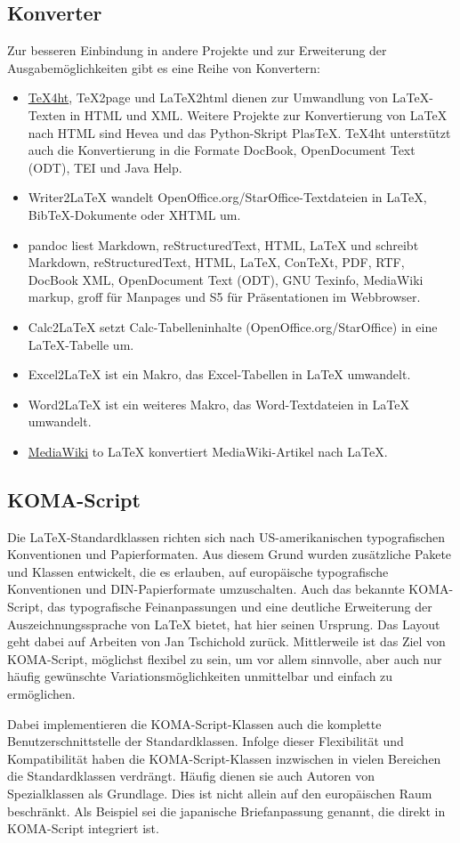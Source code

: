 \subsection{Konverter}
Zur besseren Einbindung in andere Projekte und zur Erweiterung der Ausgabemöglichkeiten gibt es eine Reihe von Konvertern:
\begin{itemize}
	\item \href{https://de.wikipedia.org/wiki/TeX4ht}{TeX4ht}, TeX2page und LaTeX2html dienen zur Umwandlung von LaTeX-Texten in HTML und XML. Weitere Projekte zur Konvertierung von LaTeX nach HTML sind Hevea und das Python-Skript PlasTeX. TeX4ht unterstützt auch die Konvertierung in die Formate DocBook, OpenDocument Text (ODT), TEI und Java Help.
	\item Writer2LaTeX wandelt OpenOffice.org/StarOffice-Textdateien in LaTeX, BibTeX-Dokumente oder XHTML um.
	\item pandoc liest Markdown, reStructuredText, HTML, LaTeX und schreibt Markdown, reStructuredText, HTML, LaTeX, ConTeXt, PDF, RTF, DocBook XML, OpenDocument Text (ODT), GNU Texinfo, MediaWiki markup, groff für Manpages und S5 für Präsentationen im Webbrowser.\cite{pandoc}
	\item Calc2LaTeX setzt Calc-Tabelleninhalte (OpenOffice.org/StarOffice) in eine LaTeX-Tabelle um.
	\item Excel2LaTeX ist ein Makro, das Excel-Tabellen in LaTeX umwandelt.
	\item Word2LaTeX ist ein weiteres Makro, das Word-Textdateien in LaTeX umwandelt.
	\item \href{http://sourceforge.net/p/wb2pdf/git/ci/master/tree/}{MediaWiki} to LaTeX konvertiert MediaWiki-Artikel nach LaTeX.
\end{itemize}

\subsection{KOMA-Script}
Die LaTeX-Standardklassen richten sich nach US-amerikanischen typografischen Konventionen und Papierformaten. Aus diesem Grund wurden zusätzliche Pakete und Klassen entwickelt, die es erlauben, auf europäische typografische Konventionen und DIN-Papierformate umzuschalten. Auch das bekannte KOMA-Script, das typografische Feinanpassungen und eine deutliche Erweiterung der Auszeichnungssprache von LaTeX bietet, hat hier seinen Ursprung. Das Layout geht dabei auf Arbeiten von Jan Tschichold zurück. Mittlerweile ist das Ziel von KOMA-Script, möglichst flexibel zu sein, um vor allem sinnvolle, aber auch nur häufig gewünschte Variationsmöglichkeiten unmittelbar und einfach zu ermöglichen.

Dabei implementieren die KOMA-Script-Klassen auch die komplette Benutzerschnittstelle der Standardklassen. Infolge dieser Flexibilität und Kompatibilität haben die KOMA-Script-Klassen inzwischen in vielen Bereichen die Standardklassen verdrängt. Häufig dienen sie auch Autoren von Spezialklassen als Grundlage. Dies ist nicht allein auf den europäischen Raum beschränkt. Als Beispiel sei die japanische Briefanpassung genannt, die direkt in KOMA-Script integriert ist.